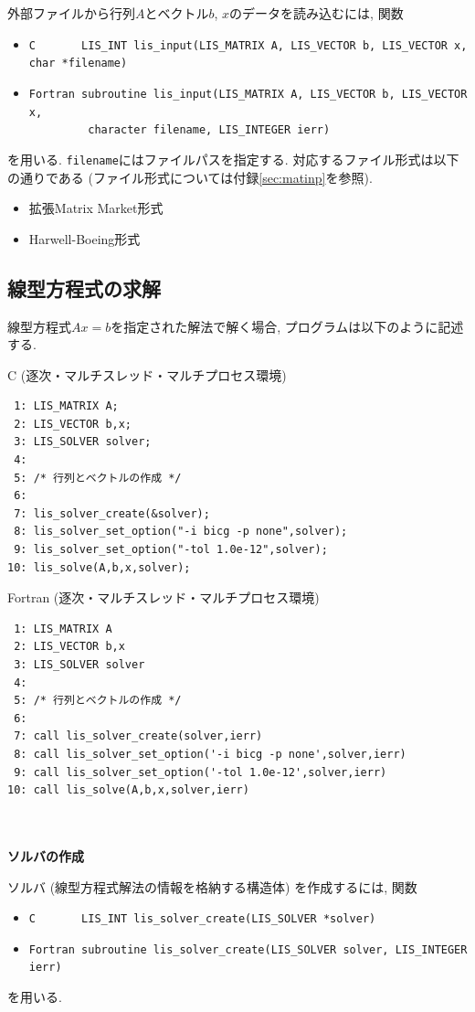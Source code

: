 \documentclass[a4paper]{jarticle}
\begin{document}
{{外部ファイルから行列$A$とベクトル$b$, $x$のデータを読み込むには, 関数
\begin{itemize}
\item \verb|C       LIS_INT lis_input(LIS_MATRIX A, LIS_VECTOR b, LIS_VECTOR x, char *filename)|
\item \verb|Fortran subroutine lis_input(LIS_MATRIX A, LIS_VECTOR b, LIS_VECTOR x,|\\
      \verb|         character filename, LIS_INTEGER ierr)|
\end{itemize}
を用いる. {\tt filename}にはファイルパスを指定する. 
対応するファイル形式は以下の通りである (ファイル形式については付録\ref{sec:matinp}を参照). 
\begin{itemize}
\item 拡張Matrix Market形式
\item Harwell-Boeing形式
\end{itemize}

\subsection{線型方程式の求解}\label{subsec:solve}
線型方程式$Ax=b$を指定された解法で解く場合, プログラムは以下のように記述する. 
\begin{itembox}[l]{C (逐次・マルチスレッド・マルチプロセス環境)}
\small
\begin{verbatim}
 1: LIS_MATRIX A; 
 2: LIS_VECTOR b,x; 
 3: LIS_SOLVER solver; 
 4:    
 5: /* 行列とベクトルの作成 */ 
 6:    
 7: lis_solver_create(&solver); 
 8: lis_solver_set_option("-i bicg -p none",solver); 
 9: lis_solver_set_option("-tol 1.0e-12",solver); 
10: lis_solve(A,b,x,solver); 
\end{verbatim}
\end{itembox}
\begin{itembox}[l]{Fortran (逐次・マルチスレッド・マルチプロセス環境)}
\small
\begin{verbatim}
 1: LIS_MATRIX A 
 2: LIS_VECTOR b,x 
 3: LIS_SOLVER solver 
 4:    
 5: /* 行列とベクトルの作成 */ 
 6:    
 7: call lis_solver_create(solver,ierr) 
 8: call lis_solver_set_option('-i bicg -p none',solver,ierr) 
 9: call lis_solver_set_option('-tol 1.0e-12',solver,ierr) 
10: call lis_solve(A,b,x,solver,ierr) 
\end{verbatim}
\end{itembox}
\\ \\
\noindent
{\bf ソルバの作成}

ソルバ (線型方程式解法の情報を格納する構造体) を作成するには, 関数
\begin{itemize}
\item \verb|C       LIS_INT lis_solver_create(LIS_SOLVER *solver)|
\item \verb|Fortran subroutine lis_solver_create(LIS_SOLVER solver, LIS_INTEGER ierr) |
\end{itemize}
を用いる. 
\\ \\

}}
\end{document}
